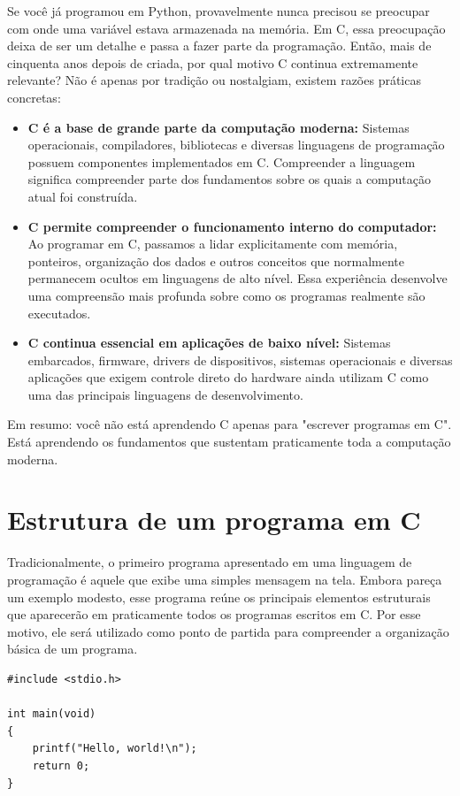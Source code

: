 \documentclass[12pt,a4paper,oneside]{extreport}
\begin{document}
Se você já programou em Python, provavelmente nunca precisou se preocupar com onde uma variável estava armazenada na memória. Em C, essa preocupação deixa de ser um detalhe e passa a fazer parte da programação. Então, mais de cinquenta anos depois de criada, por qual motivo C continua extremamente relevante? 
Não é apenas por tradição ou nostalgiam, existem razões práticas concretas:


\begin{itemize}
    \item[--] \textbf{C é a base de grande parte da computação moderna:} Sistemas operacionais, compiladores, bibliotecas e diversas linguagens de programação possuem componentes implementados em C. Compreender a linguagem significa compreender parte dos fundamentos sobre os quais a computação atual foi construída.
    \item[--] \textbf{C permite compreender o funcionamento interno do computador:} Ao programar em C, passamos a lidar explicitamente com memória, ponteiros, organização dos dados e outros conceitos que normalmente permanecem ocultos em linguagens de alto nível. Essa experiência desenvolve uma compreensão mais profunda sobre como os programas realmente são executados.
    \item[--] \textbf{C continua essencial em aplicações de baixo nível:} Sistemas embarcados, firmware, drivers de dispositivos, sistemas operacionais e diversas aplicações que exigem controle direto do hardware ainda utilizam C como uma das principais linguagens de desenvolvimento.
\end{itemize}

Em resumo: você não está aprendendo C apenas para "escrever programas em C". Está aprendendo os fundamentos que sustentam praticamente toda a computação moderna.


\section{Estrutura de um programa em C}

Tradicionalmente, o primeiro programa apresentado em uma linguagem de programação é aquele que exibe uma simples mensagem na tela. Embora pareça um exemplo modesto, esse programa reúne os principais elementos estruturais que aparecerão em praticamente todos os programas escritos em C. Por esse motivo, ele será utilizado como ponto de partida para compreender a organização básica de um programa.

\begin{lstlisting}
#include <stdio.h>

int main(void)
{
    printf("Hello, world!\n");
    return 0;
}
\end{lstlisting}
\end{document}
